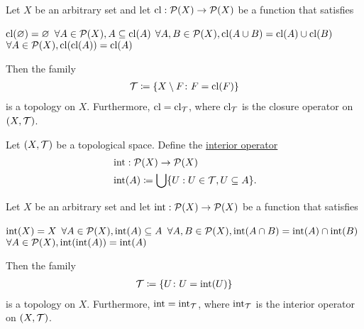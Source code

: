 \begin{proposition}\label{thm:closure_operator_axioms}\cite[14]{Engelking1989}
  Let $X$ be an arbitrary set and let $\operatorname{cl}: \operatorname{\mathcal P}(X) \to \operatorname{\mathcal P}(X)$ be a function that satisfies
  \begin{description}
     $\operatorname{cl}(\varnothing) = \varnothing$
     $\forall A \in \operatorname{\mathcal P}(X), A \subseteq \operatorname{cl}(A)$
     $\forall A, B \in \operatorname{\mathcal P}(X), \operatorname{cl}(A \cup B) = \operatorname{cl}(A) \cup \operatorname{cl}(B)$
     $\forall A \in \operatorname{\mathcal P}(X), \operatorname{cl}(\operatorname{cl}(A)) = \operatorname{cl}(A)$
  \end{description}

  Then the family
  \begin{align*}
    \mathcal T \coloneqq \{ X \setminus F \colon F = \operatorname{cl}(F) \}
  \end{align*}
  is a topology on $X$. Furthermore, $\operatorname{cl} = \operatorname{cl}_{\mathcal T}$, where $\operatorname{cl}_{\mathcal T}$ is the closure operator on $(X, \mathcal T)$.
\end{proposition}

\begin{definition}\label{def:interior_operator}\cite[15]{Engelking1989}
  Let $(X, \mathcal T)$ be a topological space. Define the \uline{interior operator}
  \begin{align*}
    &\operatorname{int}: \operatorname{\mathcal P}(X) \to \operatorname{\mathcal P}(X) \\
    &\operatorname{int}(A) \coloneqq \bigcup \{ U : U \in \mathcal T, U \subseteq A \}.
  \end{align*}
\end{definition}

\begin{proposition}\label{thm:interior_operator_axioms}
  Let $X$ be an arbitrary set and let $\operatorname{int}: \operatorname{\mathcal P}(X) \to \operatorname{\mathcal P}(X)$ be a function that satisfies
  \begin{description}
     $\operatorname{int}(X) = X$
     $\forall A \in \operatorname{\mathcal P}(X), \operatorname{int}(A) \subseteq A$
     $\forall A, B \in \operatorname{\mathcal P}(X), \operatorname{int}(A \cap B) = \operatorname{int}(A) \cap \operatorname{int}(B)$
     $\forall A \in \operatorname{\mathcal P}(X), \operatorname{int}(\operatorname{int}(A)) = \operatorname{int}(A)$
  \end{description}

  Then the family
  \begin{align*}
    \mathcal T \coloneqq \{ U \colon U = \operatorname{int}(U) \}
  \end{align*}
  is a topology on $X$. Furthermore, $\operatorname{int} = \operatorname{int}_{\mathcal T}$, where $\operatorname{int}_{\mathcal T}$ is the interior operator on $(X, \mathcal T)$.
\end{proposition}
